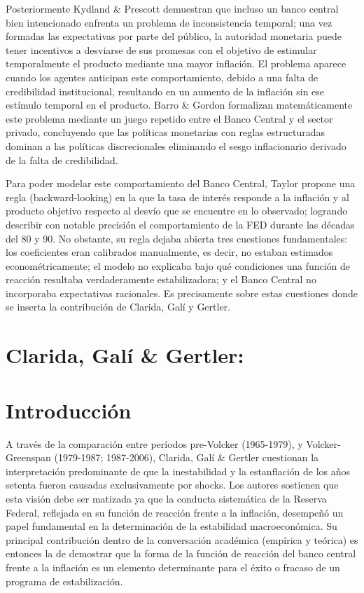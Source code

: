 \documentclass[12pt]{article}
\begin{document}
\indent Posteriormente Kydland \& Prescott demuestran que incluso un banco central bien intencionado enfrenta un problema de inconsistencia temporal; una vez formadas las expectativas por parte del público, la autoridad monetaria puede tener incentivos a desviarse de sus promesas con el objetivo de estimular temporalmente el producto mediante una mayor inflación. El problema aparece cuando los agentes anticipan este comportamiento, debido a una falta de credibilidad institucional, resultando en un aumento de la inflación sin ese estímulo temporal en el producto. Barro \& Gordon formalizan matemáticamente este problema mediante un juego repetido entre el Banco Central y el sector privado, concluyendo que las políticas monetarias con reglas estructuradas dominan a las políticas discrecionales eliminando el sesgo inflacionario derivado de la falta de credibilidad.

\vspace{1em}

\indent Para poder modelar este comportamiento del Banco Central, Taylor propone una regla (backward-looking)  en la que la tasa de interés responde a la inflación y al producto objetivo respecto al desvío que se encuentre en lo observado; logrando describir con notable precisión el comportamiento  de la FED durante las décadas del 80 y 90. 
No obstante, su regla dejaba abierta tres cuestiones fundamentales: los coeficientes eran calibrados manualmente, es decir, no estaban estimados econométricamente; el modelo no explicaba bajo qué condiciones una función de reacción resultaba verdaderamente estabilizadora; y el Banco Central no incorporaba expectativas racionales. Es precisamente sobre estas cuestiones donde se inserta la contribución de Clarida, Galí y Gertler.



\section*{Clarida, Galí \& Gertler:}

\section{Introducción}
\indent A través de la comparación entre períodos pre-Volcker (1965-1979), y Volcker-Greenspan (1979-1987; 1987-2006), Clarida, Galí \& Gertler cuestionan la interpretación predominante de que la inestabilidad y la estanflación de los años setenta fueron causadas exclusivamente por shocks. Los autores sostienen que esta visión debe ser matizada ya que la conducta sistemática de la Reserva Federal, reflejada en su función de reacción frente a la inflación, desempeñó un papel fundamental en la determinación de la estabilidad macroeconómica. Su principal contribución dentro de la conversación académica (empírica y teórica) es entonces la de demostrar que la forma de la función de reacción del banco central frente a la inflación es un elemento determinante para el éxito o fracaso de un programa de estabilización.
\end{document}
